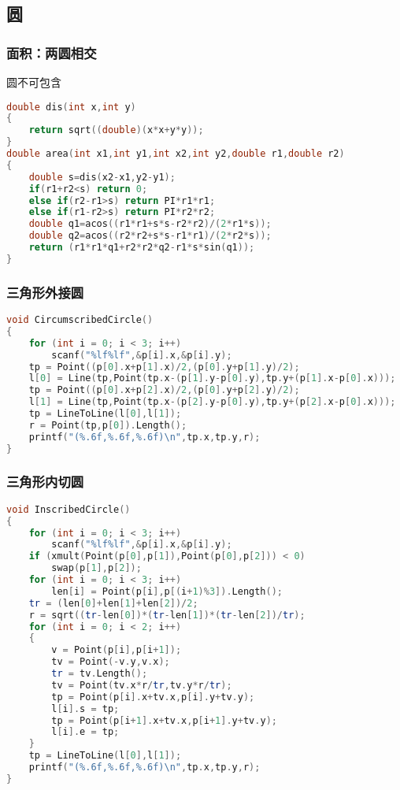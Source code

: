 \subsection{圆}	
	\subsubsection{面积：两圆相交}
	圆不可包含
	\begin{lstlisting}[language=c++]
double dis(int x,int y)
{
	return sqrt((double)(x*x+y*y));
}
double area(int x1,int y1,int x2,int y2,double r1,double r2)
{
	double s=dis(x2-x1,y2-y1);
	if(r1+r2<s) return 0;
	else if(r2-r1>s) return PI*r1*r1;
	else if(r1-r2>s) return PI*r2*r2;
	double q1=acos((r1*r1+s*s-r2*r2)/(2*r1*s));
	double q2=acos((r2*r2+s*s-r1*r1)/(2*r2*s));
	return (r1*r1*q1+r2*r2*q2-r1*s*sin(q1));
}
	\end{lstlisting}
	
	\subsubsection{三角形外接圆}
	\begin{lstlisting}[language=c++]
void CircumscribedCircle()
{
	for (int i = 0; i < 3; i++)
		scanf("%lf%lf",&p[i].x,&p[i].y);
	tp = Point((p[0].x+p[1].x)/2,(p[0].y+p[1].y)/2);
	l[0] = Line(tp,Point(tp.x-(p[1].y-p[0].y),tp.y+(p[1].x-p[0].x)));
	tp = Point((p[0].x+p[2].x)/2,(p[0].y+p[2].y)/2);
	l[1] = Line(tp,Point(tp.x-(p[2].y-p[0].y),tp.y+(p[2].x-p[0].x)));
	tp = LineToLine(l[0],l[1]);
	r = Point(tp,p[0]).Length();
	printf("(%.6f,%.6f,%.6f)\n",tp.x,tp.y,r);
}
	\end{lstlisting}
	
	\subsubsection{三角形内切圆}
	\begin{lstlisting}[language=c++]
void InscribedCircle()
{
	for (int i = 0; i < 3; i++)
		scanf("%lf%lf",&p[i].x,&p[i].y);
	if (xmult(Point(p[0],p[1]),Point(p[0],p[2])) < 0)
		swap(p[1],p[2]);
	for (int i = 0; i < 3; i++)
		len[i] = Point(p[i],p[(i+1)%3]).Length();
	tr = (len[0]+len[1]+len[2])/2;
	r = sqrt((tr-len[0])*(tr-len[1])*(tr-len[2])/tr);
	for (int i = 0; i < 2; i++)
	{
		v = Point(p[i],p[i+1]);
		tv = Point(-v.y,v.x);
		tr = tv.Length();
		tv = Point(tv.x*r/tr,tv.y*r/tr);
		tp = Point(p[i].x+tv.x,p[i].y+tv.y);
		l[i].s = tp;
		tp = Point(p[i+1].x+tv.x,p[i+1].y+tv.y);
		l[i].e = tp;
	}
	tp = LineToLine(l[0],l[1]);
	printf("(%.6f,%.6f,%.6f)\n",tp.x,tp.y,r);
}
	\end{lstlisting}
	

